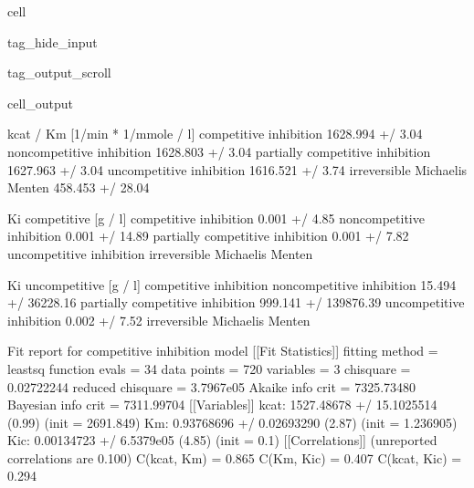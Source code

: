 \documentclass[letterpaper,10pt,english]{jupyterBook}
\begin{document}
\begin{sphinxuseclass}{cell}
\begin{sphinxuseclass}{tag_hide_input}
\begin{sphinxuseclass}{tag_output_scroll}
\begin{sphinxVerbatimOutput}
\begin{sphinxuseclass}{cell_output}
\begin{sphinxVerbatim}[commandchars=\\\{\}]
                                 kcat / Km [1/min * 1/mmole / l]  \PYGZbs{}
competitive inhibition                        1628.994 +/\PYGZhy{} 3.04\PYGZpc{}   
non\PYGZhy{}competitive inhibition                    1628.803 +/\PYGZhy{} 3.04\PYGZpc{}   
partially competitive inhibition              1627.963 +/\PYGZhy{} 3.04\PYGZpc{}   
uncompetitive inhibition                      1616.521 +/\PYGZhy{} 3.74\PYGZpc{}   
irreversible Michaelis Menten                 458.453 +/\PYGZhy{} 28.04\PYGZpc{}   

                                 Ki competitive [g / l]  \PYGZbs{}
competitive inhibition                  0.001 +/\PYGZhy{} 4.85\PYGZpc{}   
non\PYGZhy{}competitive inhibition             0.001 +/\PYGZhy{} 14.89\PYGZpc{}   
partially competitive inhibition        0.001 +/\PYGZhy{} 7.82\PYGZpc{}   
uncompetitive inhibition                              \PYGZhy{}   
irreversible Michaelis Menten                         \PYGZhy{}   

                                 Ki uncompetitive [g / l]  
competitive inhibition                                  \PYGZhy{}  
non\PYGZhy{}competitive inhibition           15.494 +/\PYGZhy{} 36228.16\PYGZpc{}  
partially competitive inhibition   999.141 +/\PYGZhy{} 139876.39\PYGZpc{}  
uncompetitive inhibition                  0.002 +/\PYGZhy{} 7.52\PYGZpc{}  
irreversible Michaelis Menten                           \PYGZhy{}  
\end{sphinxVerbatim}

\begin{sphinxVerbatim}[commandchars=\\\{\}]
Fit report for competitive inhibition model
[[Fit Statistics]]
    \PYGZsh{} fitting method   = leastsq
    \PYGZsh{} function evals   = 34
    \PYGZsh{} data points      = 720
    \PYGZsh{} variables        = 3
    chi\PYGZhy{}square         = 0.02722244
    reduced chi\PYGZhy{}square = 3.7967e\PYGZhy{}05
    Akaike info crit   = \PYGZhy{}7325.73480
    Bayesian info crit = \PYGZhy{}7311.99704
[[Variables]]
    k\PYGZus{}cat:  1527.48678 +/\PYGZhy{} 15.1025514 (0.99\PYGZpc{}) (init = 2691.849)
    Km:     0.93768696 +/\PYGZhy{} 0.02693290 (2.87\PYGZpc{}) (init = 1.236905)
    K\PYGZus{}ic:   0.00134723 +/\PYGZhy{} 6.5379e\PYGZhy{}05 (4.85\PYGZpc{}) (init = 0.1)
[[Correlations]] (unreported correlations are \PYGZlt{} 0.100)
    C(k\PYGZus{}cat, Km)   = 0.865
    C(Km, K\PYGZus{}ic)    = 0.407
    C(k\PYGZus{}cat, K\PYGZus{}ic) = 0.294
\end{sphinxVerbatim}


\end{sphinxuseclass}
\end{sphinxVerbatimOutput}
\end{sphinxuseclass}
\end{sphinxuseclass}
\end{sphinxuseclass}
\end{document}
